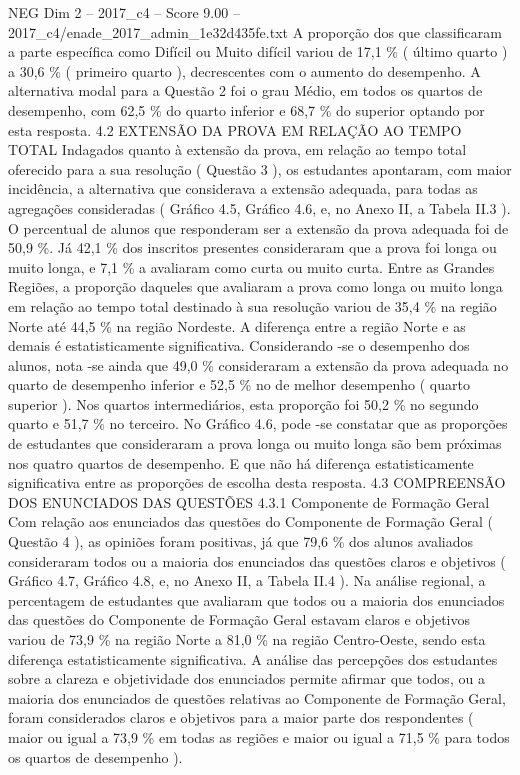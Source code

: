 \begin{textsample}{NEG Dim 2 – 2017\_c4 – Score 9.00 – 2017\_c4/enade\_2017\_admin\_1e32d435fe.txt}
A proporção dos que classificaram a parte específica como Difícil ou Muito difícil variou de 17,1 \% ( último quarto ) a 30,6 \% ( primeiro quarto ), decrescentes com o aumento do desempenho.
A alternativa modal para a Questão 2 foi o grau Médio, em todos os quartos de desempenho, com 62,5 \% do quarto inferior e 68,7 \% do superior optando por esta resposta. 4.2 EXTENSÃO DA PROVA EM RELAÇÃO AO TEMPO TOTAL Indagados quanto à extensão da prova, em relação ao tempo total oferecido para a sua resolução ( Questão 3 ), os estudantes apontaram, com maior incidência, a alternativa que considerava a extensão adequada, para todas as agregações consideradas ( Gráfico 4.5, Gráfico 4.6, e, no Anexo II, a Tabela II.3 ).
O percentual de alunos que responderam ser a extensão da prova adequada foi de 50,9 \%.
Já 42,1 \% dos inscritos presentes consideraram que a prova foi longa ou muito longa, e 7,1 \% a avaliaram como curta ou muito curta.
Entre as Grandes Regiões, a proporção daqueles que avaliaram a prova como longa ou muito longa em relação ao tempo total destinado à sua resolução variou de 35,4 \% na região Norte até 44,5 \% na região Nordeste.
A diferença entre a região Norte e as demais é estatisticamente significativa.
Considerando -se o desempenho dos alunos, nota -se ainda que 49,0 \% consideraram a extensão da prova adequada no quarto de desempenho inferior e 52,5 \% no de melhor desempenho ( quarto superior ).
Nos quartos intermediários, esta proporção foi 50,2 \% no segundo quarto e 51,7 \% no terceiro.
No Gráfico 4.6, pode -se constatar que as proporções de estudantes que consideraram a prova longa ou muito longa são bem próximas nos quatro quartos de desempenho.
E que não há diferença estatisticamente significativa entre as proporções de escolha desta resposta. 4.3 COMPREENSÃO DOS ENUNCIADOS DAS QUESTÕES 4.3.1 Componente de Formação Geral Com relação aos enunciados das questões do Componente de Formação Geral ( Questão 4 ), as opiniões foram positivas, já que 79,6 \% dos alunos avaliados consideraram todos ou a maioria dos enunciados das questões claros e objetivos ( Gráfico 4.7, Gráfico 4.8, e, no Anexo II, a Tabela II.4 ).
Na análise regional, a percentagem de estudantes que avaliaram que todos ou a maioria dos enunciados das questões do Componente de Formação Geral estavam claros e objetivos variou de 73,9 \% na região Norte a 81,0 \% na região Centro-Oeste, sendo esta diferença estatisticamente significativa.
A análise das percepções dos estudantes sobre a clareza e objetividade dos enunciados permite afirmar que todos, ou a maioria dos enunciados de questões relativas ao Componente de Formação Geral, foram considerados claros e objetivos para a maior parte dos respondentes ( maior ou igual a 73,9 \% em todas as regiões e maior ou igual a 71,5 \% para todos os quartos de desempenho ).

\end{textsample}
